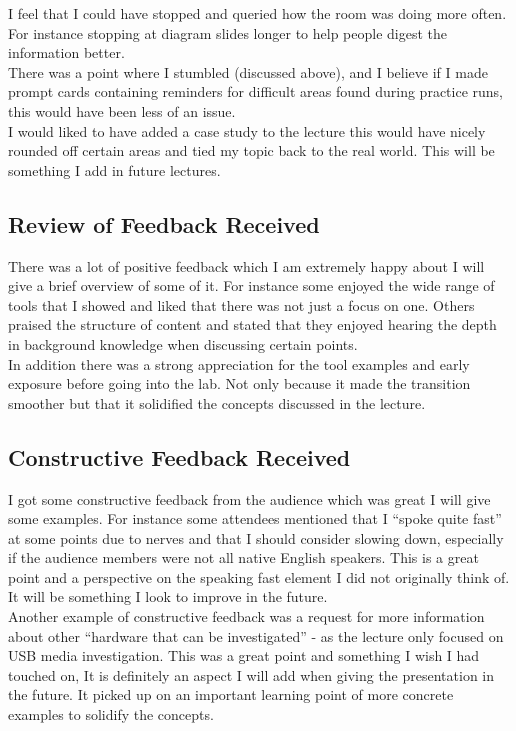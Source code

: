\documentclass[a4paper,11pt]{article}
\begin{document}
I feel that I could have stopped and queried how the room was doing more often. For instance stopping at diagram slides longer to help people digest the information better.\\

There was a point where I stumbled (discussed above), and I believe if I made prompt cards containing reminders for difficult areas found during practice runs, this would have been less of an issue.\\

I would liked to have added a case study to the lecture this would have nicely rounded off certain areas and tied my topic back to the real world. This will be something I add in future lectures.

\subsection{Review of Feedback Received}
There was a lot of positive feedback which I am extremely happy about I will give a brief overview of some of it. For instance some enjoyed the wide range of tools that I showed and liked that there was not just a focus on one. Others praised the structure of content and stated that they enjoyed hearing the depth in background knowledge when discussing certain points.\\
 
In addition there was a strong appreciation for the tool examples and early exposure before going into the lab. Not only because it made the transition smoother but that it solidified the concepts discussed in the lecture.

\subsection{Constructive Feedback Received}
I got some constructive feedback from the audience which was great I will give some examples. For instance some attendees mentioned that I ``spoke quite fast'' at some points due to nerves and that I should consider slowing down, especially if the audience members were not all native English speakers. This is a great point and a perspective on the speaking fast element I did not originally think of. It will be something I look to improve in the future.\\

Another example of constructive feedback was a request for more information about other ``hardware that can be investigated'' - as the lecture only focused on USB media investigation. This was a great point and something I wish I had touched on, It is definitely an aspect I will add when giving the presentation in the future. It picked up on an important learning point of more concrete examples to solidify the concepts.
\end{document}
